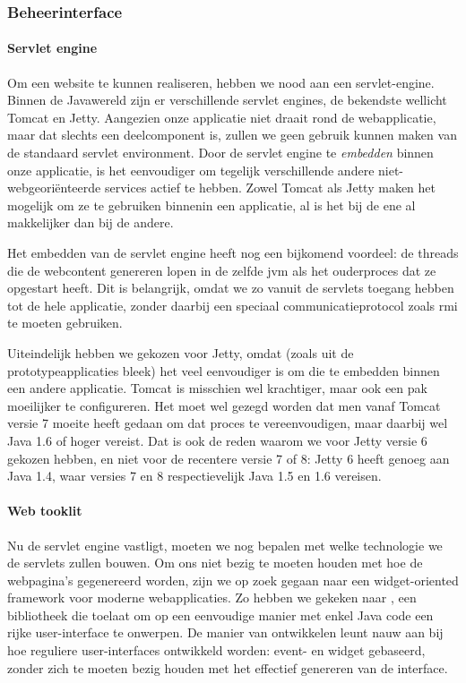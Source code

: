 \subsubsection{Beheerinterface}

\paragraph{Servlet engine} Om een website te kunnen realiseren, hebben we nood aan een servlet-engine. Binnen de Javawereld zijn er verschillende servlet engines, de bekendste wellicht Tomcat en Jetty. Aangezien onze applicatie niet draait rond de webapplicatie, maar dat slechts een deelcomponent is, zullen we geen gebruik kunnen maken van de standaard servlet environment. Door de servlet engine te \emph{embedden} binnen onze applicatie, is het eenvoudiger om tegelijk verschillende andere niet-webgeoriënteerde services actief te hebben. Zowel Tomcat als Jetty maken het mogelijk om ze te gebruiken binnenin een applicatie, al is het bij de ene al makkelijker dan bij de andere.

Het embedden van de servlet engine heeft nog een bijkomend voordeel: de threads die de webcontent genereren lopen in de zelfde \ac{jvm} als het ouderproces dat ze opgestart heeft. Dit is belangrijk, omdat we zo vanuit de servlets toegang hebben tot de hele applicatie, zonder daarbij een speciaal communicatieprotocol zoals \ac{rmi} te moeten gebruiken.

Uiteindelijk hebben we gekozen voor Jetty, omdat (zoals uit de prototypeapplicaties bleek) het veel eenvoudiger is om die te embedden binnen een andere applicatie. Tomcat is misschien wel krachtiger, maar ook een pak moeilijker te configureren. Het moet wel gezegd worden dat men vanaf Tomcat versie 7 moeite heeft gedaan om dat proces te vereenvoudigen, maar daarbij wel Java 1.6 of hoger vereist. Dat is ook de reden waarom we voor Jetty versie 6 gekozen hebben, en niet voor de recentere versie 7 of 8: Jetty 6 heeft genoeg aan Java 1.4, waar versies 7 en 8 respectievelijk Java 1.5 en 1.6 vereisen.

\paragraph{Web tooklit} Nu de servlet engine vastligt, moeten we nog bepalen met welke technologie we de servlets zullen bouwen. Om ons niet bezig te moeten houden met hoe de webpagina's gegenereerd worden, zijn we op zoek gegaan naar een widget-oriented framework voor moderne webapplicaties. Zo hebben we gekeken naar , een bibliotheek die toelaat om op een eenvoudige manier met enkel Java code een rijke user-interface te onwerpen. De manier van ontwikkelen leunt nauw aan bij hoe reguliere user-interfaces ontwikkeld worden: event- en widget gebaseerd, zonder zich te moeten bezig houden met het effectief genereren van de interface.

